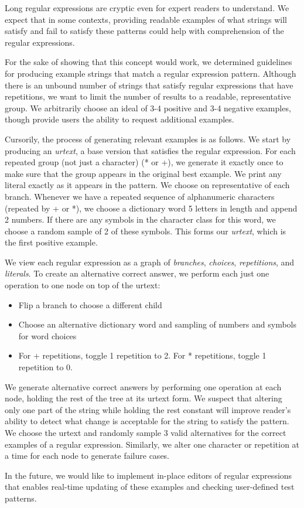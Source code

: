 Long regular expressions are cryptic even for expert readers to understand.
We expect that in some contexts, providing readable examples of what strings will satisfy and fail to satisfy these patterns could help with comprehension of the regular expressions.

For the sake of showing that this concept would work, we determined guidelines for producing example strings that match a regular expression pattern.
Although there is an unbound number of strings that satisfy regular expressions that have repetitions, we want to limit the number of results to a readable, representative group.
We arbitrarily choose an ideal of 3-4 positive and 3-4 negative examples, though provide users the ability to request additional examples.

Cursorily, the process of generating relevant examples is as follows.
We start by producing an \emph{urtext}, a base version that satisfies the regular expression.
For each repeated group (not just a character) (* or +), we generate it exactly once to make sure that the group appears in the original best example.
We print any literal exactly as it appears in the pattern.
We choose on representative of each branch.
Whenever we have a repeated sequence of alphanumeric characters (repeated by + or *), we choose a dictionary word 5 letters in length and append 2 numbers.
If there are any symbols in the character class for this word, we choose a random sample of 2 of these symbols.
This forms our \emph{urtext}, which is the first positive example.

We view each regular expression as a graph of \emph{branches}, \emph{choices}, \emph{repetitions}, and \emph{literals}.
To create an alternative correct answer, we perform each just one operation to one node on top of the urtext:
\begin{itemize}
\item Flip a branch to choose a different child
\item Choose an alternative dictionary word and sampling of numbers and symbols for word choices
\item For + repetitions, toggle 1 repetition to 2.  For * repetitions, toggle 1 repetition to 0.
\end{itemize}

We generate alternative correct answers by performing one operation at each node, holding the rest of the tree at its urtext form.
We suspect that altering only one part of the string while holding the rest constant will improve reader's ability to detect what change is acceptable for the string to satisfy the pattern.
We choose the urtext and randomly sample 3 valid alternatives for the correct examples of a regular expression.
Similarly, we alter one character or repetition at a time for each node to generate failure cases.

In the future, we would like to implement in-place editors of regular expressions that enables real-time updating of these examples and checking user-defined test patterns.
